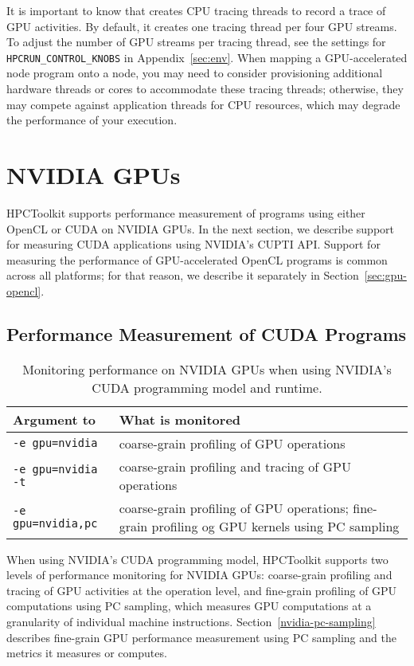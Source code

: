 It is important to know that \hpcrun{} creates CPU tracing threads to record a trace of GPU activities. By default, it creates one tracing thread per four GPU streams. To adjust the number of GPU streams per tracing thread, see the settings for {\tt HPCRUN\_CONTROL\_KNOBS} in Appendix~\ref{sec:env}.
When mapping a GPU-accelerated node program onto a node, you may need to consider provisioning additional hardware threads or cores to accommodate these tracing threads; otherwise, they may compete against  application threads for CPU resources, which  may degrade the performance of your execution. 

\section{NVIDIA GPUs}

HPCToolkit supports performance measurement of programs using either OpenCL or CUDA on NVIDIA GPUs. In the next section, we describe support for measuring CUDA applications using NVIDIA's CUPTI API. Support for measuring the performance of GPU-accelerated OpenCL programs is common across all platforms; for that reason, we describe it separately in Section~\ref{sec:gpu-opencl}.

\subsection{Performance Measurement of CUDA Programs}
\label{sec:nvidia-gpu}

\begin{table}[t]
\centering
\begin{tabular}{|l|p{3.5in}|}\hline
Argument to \hpcrun{} & What is monitored\\\hline\hline
{\tt -e gpu=nvidia} & coarse-grain profiling of GPU operations\\\hline
{\tt -e gpu=nvidia -t} & coarse-grain profiling and tracing of GPU operations\\\hline
{\tt -e gpu=nvidia,pc} &  coarse-grain profiling of GPU operations; fine-grain profiling og GPU kernels using PC sampling\\\hline
\end{tabular}
\caption{Monitoring performance on NVIDIA GPUs when using NVIDIA's CUDA programming model and runtime.}
\label{nvidia-cuda-monitoring-options} 
\end{table}

When using NVIDIA's CUDA programming model, HPCToolkit supports two levels of performance monitoring for NVIDIA GPUs: coarse-grain profiling and tracing of GPU activities at the operation level, and fine-grain profiling of GPU computations using PC sampling, which measures GPU computations at a granularity of individual machine instructions. Section~\ref{nvidia-pc-sampling} describes fine-grain GPU performance measurement using PC sampling and the metrics it measures or computes. 

